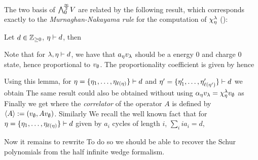 \documentclass[../main/main.tex]{subfiles}
\begin{document}
The two basis of $\bigwedge^{\!\frac\infty2}_0\!V$ are related by the following result, which corresponds exactly to the \emph{Murnaghan-Nakayama rule} for the computation of $\chi_\eta^\lambda$ (\cite[Ex. 4.45]{FH}): 
\begin{lemma}
	Let $d\in\mathbb Z_{\geq0}$, $\eta\vdash d$, then
\end{lemma}

Note that for $\lambda,\eta\vdash d$, we have that $a_\eta v_\lambda$ should be a energy 0 and charge 0 state, hence proportional to $v_\emptyset$. The proportionality coefficient is given by
hence

Using this lemma, for $\eta=\{\eta_1,\ldots,\eta_{\ell(\eta)}\}\vdash d$ and $\eta'=\{\eta'_1,\ldots,\eta'_{\ell(\eta')}\}\vdash d$ we obtain
The same result could also be obtained  without using $\alpha_{\eta} v_\lambda=\chi_\eta^\lambda v_\emptyset$ as
Finally we get
where the \emph{correlator} of the operator $A$ is defined by $\langle A\rangle:=(v_\emptyset,Av_\emptyset)$. Similarly
We recall the well known fact that for $\eta=\{\eta_1,\ldots,\eta_{\ell(\eta)}\}\vdash d$ given by $a_i$ cycles of length $i$, $\sum_i ia_i=d$,

Now it remains to rewrite
To do so we should be able to recover the Schur polynomials from the half infinite wedge formalism. 
\end{document}

